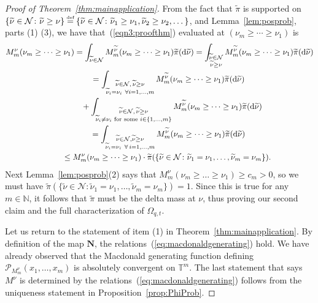\documentclass[pdftex]{sigma}
\numberwithin{equation}{section}
\newcommand\myeq{\mathrel{\stackrel{\makebox[0pt]{\mbox{\normalfont\tiny def}}}{=}}}
\newcommand{\N}{\mathbb{N}}
\newcommand{\Nu}{\mathcal{N}}
\newcommand{\PPP}{\mathcal{P}}
\newcommand{\TT}{\mathbb{T}}
\newcommand{\NN}{\mathbf{N}}
\begin{document}
\begin{proof}[Proof of Theorem~\ref{thm:mainapplication}]
From the fact that $\widetilde{\pi}$ is supported on $\{\widetilde{\nu}\in\Nu \colon \widetilde{\nu} \geq \nu\} \myeq \{\widetilde{\nu}\in\Nu \colon \widetilde{\nu}_1 \geq \nu_1, \widetilde{\nu}_2 \geq \nu_2, \dots\}$, and Lemma~\ref{lem:posprob}, parts (1) (3), we have that~(\ref{eqn3:proofthm}) evaluated at $(\nu_m \geq \cdots \geq \nu_1)$ is
\begin{gather*}
M^{\nu}_m(\nu_m \geq \dots \geq \nu_1)
= \int_{\widetilde{\nu}\in\Nu}{{M_m^{\widetilde{\nu}}(\nu_m \geq \dots \geq \nu_1)\widetilde{\pi}({\rm d}\widetilde{\nu})}}
= \int_{\substack{\widetilde{\nu}\in\Nu \\ \widetilde{\nu} \geq \nu}}{{M_m^{\widetilde{\nu}}(\nu_m \geq \dots \geq \nu_1)\widetilde{\pi}({\rm d}\widetilde{\nu})}}\\
\qquad{} = \int_{\substack{\widetilde{\nu}\in\Nu,\, \widetilde{\nu} \geq \nu \\ \widetilde{\nu}_i = \nu_i \ \forall i = 1, \dots, m}}{{M_m^{\widetilde{\nu}}(\nu_m \geq \dots \geq \nu_1)\widetilde{\pi}({\rm d}\widetilde{\nu})}}\\
\qquad\quad{} + \int_{\substack{\widetilde{\nu}\in\Nu, \, \widetilde{\nu} \geq \nu \\ \widetilde{\nu}_i \neq \nu_i \textrm{ for some }i\in\{1, \dots, m\}}}{{M_m^{\widetilde{\nu}}(\nu_m \geq \dots \geq \nu_1)\widetilde{\pi}({\rm d}\widetilde{\nu})}}\\
\qquad{}= \int_{\substack{\widetilde{\nu}\in\Nu, \widetilde{\nu} \geq \nu \\ \widetilde{\nu}_i = \nu_i \ \forall\, i = 1, \dots, m}}{{M_m^{\widetilde{\nu}}(\nu_m \geq \dots \geq \nu_1)\widetilde{\pi}({\rm d}\widetilde{\nu})}}\\
\qquad \leq M_m^{\nu}(\nu_m \geq \dots \geq \nu_1)\cdot\widetilde{\pi}(\{\widetilde{\nu} \in \Nu\colon \widetilde{\nu}_1 = \nu_1, \dots, \widetilde{\nu}_m = \nu_m\}).
\end{gather*}
Next Lemma~\ref{lem:posprob}(2) says that $M_m^{\nu}(\nu_m \geq \dots \geq \nu_1) \geq c_m > 0$, so we must have $\widetilde{\pi}(\{\widetilde{\nu} \in \Nu\colon \widetilde{\nu}_1 = \nu_1, \dots, \widetilde{\nu}_m = \nu_m\}) = 1$. Since this is true for any $m\in\N$, it follows that $\widetilde{\pi}$ must be the delta mass at $\nu$, thus proving our second claim and the full characterization of $\Omega_{q, t}$.

Let us return to the statement of item (1) in Theorem~\ref{thm:mainapplication}.
By def\/inition of the map $\NN$, the relations~(\ref{eq:macdonaldgenerating}) hold.
We have already observed that the Macdonald generating function def\/ining $\PPP_{M_m^{\nu}}(x_1, \dots, x_m)$ is absolutely convergent on $\TT^m$.
The last statement that says $M^{\nu}$ is determined by the relations~(\ref{eq:macdonaldgenerating}) follows from the uniqueness statement in Proposition~\ref{prop:PhiProb}.


\end{proof}
\end{document}
